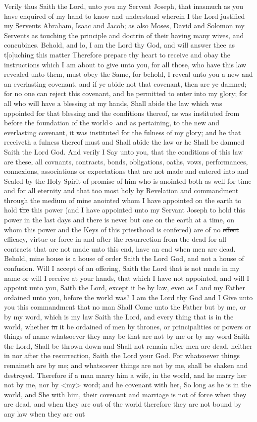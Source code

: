 				Verily thus Saith the Lord, unto you my Servent Joseph, that inasmuch as you have enquired of my hand to know and understand wherein I the Lord justified my Servents Abraham, Isaac and Jacob; as also Moses, David and Solomon my Servents as touching the principle and doctrin of their having many wives, and concubines. Behold, and lo, I am the Lord thy God, and will answer thee as t[o]uching this matter Therefore prepare thy heart to receive and obay the instructions which I am about to give unto you, for all those, who have this law revealed unto them, must obey the Same, for behold, I reveal unto you a new and an everlasting covenant, and if ye abide not that covenant, then are ye damned; for no one can reject this covenant, and be permitted to enter into my glory; for all who will have a blessing at my hands, Shall abide the law which was appointed for that blessing and the conditions thereof, as was instituted from before the foundation of the world$\diamond$ and as pertaining, to the new and everlasting covenant, it was instituted for the fulness of my glory; and he that receiveth a fulness thereof must and Shall abide the law or he Shall be damned Saith the Lord God. And verily I Say unto you, that the conditions of this law are these, all covnants, contracts, bonds, obligations, oaths, vows, performances, connexions, associations or expectations that are not made and entered into and Sealed by the Holy Spirit of promise of him who is anointed both as well for time and for all eternity and that too most holy by Revelation and commandment through the medium of mine anointed whom I have appointed on the earth to hold \sout{the} this power (and I have appointed unto my Servant Joseph to hold this power in the last days and there is never but one on the earth at a time, on whom this power and the Keys of this priesthood is confered) are of no \sout{effect} efficacy, virtue or force in and after the resurrection from the dead for all contracts that are not made unto this end, have an end when men are dead. Behold, mine house is a house of order Saith the Lord God, and not a house of confusion. Will I accept of an offering, Saith the Lord that is not made in my name or will I receive at your hands, that which I have not appointed, and will I appoint unto you, Saith the Lord, except it be by law, even as I and my Father ordained unto you, before the world was? I am the Lord thy God and I Give unto you this commandment that no man Shall Come unto the Father but by me, or by my word, which is my law Saith the Lord, and every thing that is in the world, whether \sout{in} it be ordained of men by thrones, or principalities or powers or things of name whatsoever they may be that are not by me or by my word Saith the Lord, Shall be thrown down and Shall not remain after men are dead, neither in nor after the resurrection, Saith the Lord your God. For whatsoever things remaineth are by me; and whatsoever things are not by me, shall be shaken and destroyed. Therefore if a man marry him a wife, in the world, and he marry her not by me, nor by <my> word; and he covenant with her, So long as he is in the world, and She with him, their covenant and marriage is not of force when they are dead, and when they are out of the world therefore they are not bound by any law when they are out 
